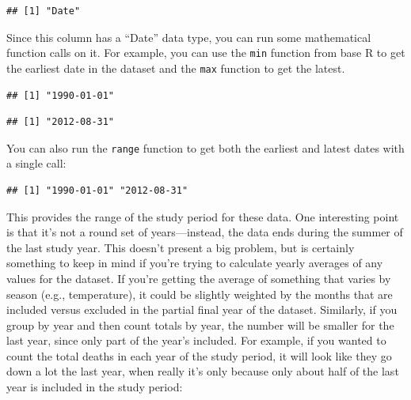\documentclass[
]{book}
\newenvironment{Shaded}{\begin{snugshade}}{\end{snugshade}}
\newcommand{\FunctionTok}[1]{\textcolor[rgb]{0.00,0.00,0.00}{#1}}
\newcommand{\NormalTok}[1]{#1}
\newcommand{\SpecialCharTok}[1]{\textcolor[rgb]{0.00,0.00,0.00}{#1}}
\begin{document}
\begin{verbatim}
## [1] "Date"
\end{verbatim}

Since this column has a ``Date'' data type, you can run some mathematical function
calls on it. For example, you can use the \texttt{min} function from base R to get the
earliest date in the dataset and the \texttt{max} function to get the latest.

\begin{Shaded}
\end{Shaded}

\begin{verbatim}
## [1] "1990-01-01"
\end{verbatim}

\begin{Shaded}
\end{Shaded}

\begin{verbatim}
## [1] "2012-08-31"
\end{verbatim}

You can also run the \texttt{range} function to get both the earliest and latest dates
with a single call:

\begin{Shaded}
\end{Shaded}

\begin{verbatim}
## [1] "1990-01-01" "2012-08-31"
\end{verbatim}

This provides the range of the study period for these data. One interesting point
is that it's not a round set of years---instead, the data ends during the summer
of the last study year. This doesn't present a big problem, but is certainly
something to keep in mind if you're trying to calculate yearly averages of
any values for the dataset. If you're getting the average of something that varies
by season (e.g., temperature), it could be slightly weighted by the months that
are included versus excluded in the partial final year of the dataset. Similarly,
if you group by year and then count totals by year, the number will be smaller
for the last year, since only part of the year's included. For example, if you
wanted to count the total deaths in each year of the study period, it will look
like they go down a lot the last year, when really it's only because only about half
of the last year is included in the study period:
\end{document}
